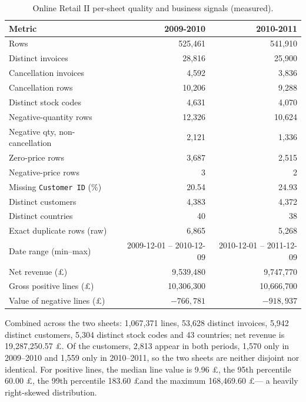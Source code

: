 \documentclass[11pt,a4paper]{article}
\newcommand{\code}[1]{\texttt{#1}}
\begin{document}
\begin{table}[H]
\centering
\small
\caption{Online Retail II per-sheet quality and business signals (measured).}
\label{tab:retail-quality}
\begin{tabular}{lrr}
\toprule
\textbf{Metric} & \textbf{2009-2010} & \textbf{2010-2011} \\
\midrule
Rows & 525{,}461 & 541{,}910 \\
Distinct invoices & 28{,}816 & 25{,}900 \\
Cancellation invoices & 4{,}592 & 3{,}836 \\
Cancellation rows & 10{,}206 & 9{,}288 \\
Distinct stock codes & 4{,}631 & 4{,}070 \\
Negative-quantity rows & 12{,}326 & 10{,}624 \\
Negative qty, non-cancellation & 2{,}121 & 1{,}336 \\
Zero-price rows & 3{,}687 & 2{,}515 \\
Negative-price rows & 3 & 2 \\
Missing \code{Customer ID} (\%) & 20.54 & 24.93 \\
Distinct customers & 4{,}383 & 4{,}372 \\
Distinct countries & 40 & 38 \\
Exact duplicate rows (raw) & 6{,}865 & 5{,}268 \\
Date range (min--max) & 2009-12-01 -- 2010-12-09 & 2010-12-01 -- 2011-12-09 \\
Net revenue (\pounds) & 9{,}539{,}480 & 9{,}747{,}770 \\
Gross positive lines (\pounds) & 10{,}306{,}300 & 10{,}666{,}700 \\
Value of negative lines (\pounds) & $-766{,}781$ & $-918{,}937$ \\
\bottomrule
\end{tabular}
\end{table}

Combined across the two sheets: 1{,}067{,}371 lines, 53{,}628 distinct invoices, 5{,}942 distinct customers, 5{,}304 distinct stock codes and 43 countries; net revenue is 19{,}287{,}250.57 \pounds. Of the customers, 2{,}813 appear in both periods, 1{,}570 only in 2009--2010 and 1{,}559 only in 2010--2011, so the two sheets are neither disjoint nor identical. For positive lines, the median line value is 9.96 \pounds, the 95th percentile 60.00 \pounds, the 99th percentile 183.60 \pounds and the maximum 168{,}469.60 \pounds --- a heavily right-skewed distribution.
\end{document}
